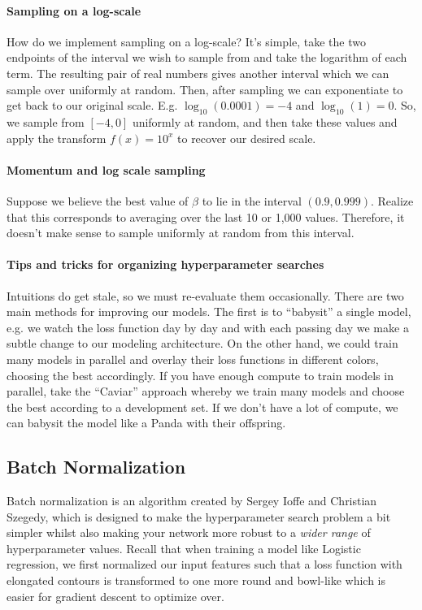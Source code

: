 \documentclass[12pt]{article}
\begin{document}
\paragraph{Sampling on a log-scale}
How do we implement sampling on a log-scale? It's simple, take the two endpoints of the interval 
we wish to sample from and take the logarithm of each term. The resulting pair of real numbers gives another interval
which we can sample over uniformly at random. Then, after sampling we can exponentiate to get back to our original scale. E.g. $\log_{10}(0.0001) = -4$ and $\log_{10}(1) = 0$. So, we sample from $[-4, 0]$ uniformly at random, and then take these values and apply the transform $f(x) = 10^x$ to recover our desired scale.

\paragraph{Momentum and log scale sampling} Suppose we believe the best value of $\beta$ to lie in the interval
$(0.9, 0.999)$. Realize that this corresponds to averaging over the last 10 or 1,000 values. Therefore, it doesn't make sense to sample uniformly at random from this interval.

\paragraph{Tips and tricks for organizing hyperparameter searches} Intuitions do get stale, so we must 
re-evaluate them occasionally. There are two main methods for improving our models. The first is to ``babysit''
a single model, e.g. we watch the loss function day by day and with each passing day we make a subtle change to our
modeling architecture. On the other hand, we could train many models in parallel and overlay their loss functions
in different colors, choosing the best accordingly. If you have enough compute to train models in parallel, take the ``Caviar'' approach whereby we train many models and choose the best according to a development set. If we don't have a lot of compute, we can babysit the model like a Panda with their offspring.

\subsection{Batch Normalization}
Batch normalization is an algorithm created by Sergey Ioffe and Christian Szegedy, which is designed to make the
hyperparameter search problem a bit simpler whilst also making your network more robust to a \emph{wider range} 
of hyperparameter values. Recall that when training
a model like Logistic regression, we first normalized our input features such that a loss function 
with elongated contours is transformed to one more round and bowl-like which is easier for gradient descent to
optimize over.
\end{document}
